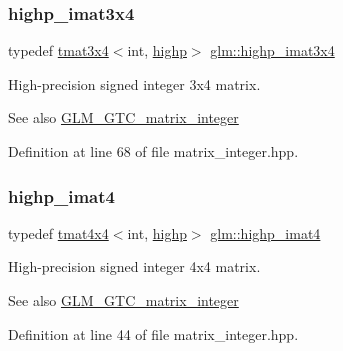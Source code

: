 \subsubsection{\texorpdfstring{highp\_imat3x4}{highp\_imat3x4}}
{\footnotesize\ttfamily typedef \mbox{\hyperlink{structglm_1_1tmat3x4}{tmat3x4}}$<$int, \mbox{\hyperlink{namespaceglm_a0f04f086094c747d227af4425893f545ac6f7eab42eacbb10d59a58e95e362074}{highp}}$>$ \mbox{\hyperlink{group__gtc__matrix__integer_gabcd2d8d764b11db413259ee5cafd8446}{glm\+::highp\+\_\+imat3x4}}}

High-\/precision signed integer 3x4 matrix. \begin{DoxySeeAlso}{See also}
\mbox{\hyperlink{group__gtc__matrix__integer}{G\+L\+M\+\_\+\+G\+T\+C\+\_\+matrix\+\_\+integer}} 
\end{DoxySeeAlso}


Definition at line 68 of file matrix\+\_\+integer.\+hpp.

\mbox{\label{group__gtc__matrix__integer_gaa5eedcb20883541c3f7f2862cbd0b446}} 
\subsubsection{\texorpdfstring{highp\_imat4}{highp\_imat4}}
{\footnotesize\ttfamily typedef \mbox{\hyperlink{structglm_1_1tmat4x4}{tmat4x4}}$<$int, \mbox{\hyperlink{namespaceglm_a0f04f086094c747d227af4425893f545ac6f7eab42eacbb10d59a58e95e362074}{highp}}$>$ \mbox{\hyperlink{group__gtc__matrix__integer_gaa5eedcb20883541c3f7f2862cbd0b446}{glm\+::highp\+\_\+imat4}}}

High-\/precision signed integer 4x4 matrix. \begin{DoxySeeAlso}{See also}
\mbox{\hyperlink{group__gtc__matrix__integer}{G\+L\+M\+\_\+\+G\+T\+C\+\_\+matrix\+\_\+integer}} 
\end{DoxySeeAlso}


Definition at line 44 of file matrix\+\_\+integer.\+hpp.

\mbox{\label{group__gtc__matrix__integer_ga7b936ac315e12b546d2597a4bffee4a1}} 
